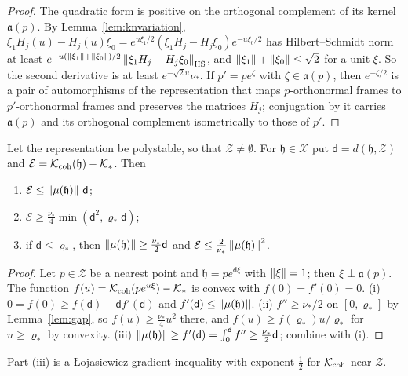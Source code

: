 \begin{proof}
The quadratic form is positive on the orthogonal complement of its kernel
$\mathfrak a(p)$. By Lemma~\ref{lem:knvariation},
$\xi_1H_j(u)-H_j(u)\xi_0=e^{u\xi_1/2}(\xi_1H_j-H_j\xi_0)e^{-u\xi_0/2}$ has
Hilbert--Schmidt norm at least
$e^{-u(\left\lVert\xi_1\right\rVert+\left\lVert\xi_0\right\rVert)/2}\left\lVert\xi_1H_j-H_j\xi_0\right\rVert_{\mathrm{HS}}$, and
$\left\lVert\xi_1\right\rVert+\left\lVert\xi_0\right\rVert\leq\sqrt2$ for a unit $\xi$. So the second
derivative is at least $e^{-\sqrt2u}\nu_*$. If $p'=pe^\zeta$ with
$\zeta\in\mathfrak a(p)$, then $e^{-\zeta/2}$ is a pair of automorphisms of
the representation that maps $p$-orthonormal frames to $p'$-orthonormal
frames and preserves the matrices $H_j$; conjugation by it carries
$\mathfrak a(p)$ and its orthogonal complement isometrically to those of
$p'$.
\end{proof}

\begin{lemma}\label{lem:kngrowth}
Let the representation be polystable, so that $\mathcal Z\neq\emptyset$.
For $\mathfrak h\in\mathcal X$ put $\mathsf d=d(\mathfrak h,\mathcal Z)$ and
$\mathcal E=\mathcal K_{\mathrm{coh}}(\mathfrak h)-\mathcal K_*$. Then
\begin{enumerate}
\item[(i)] $\mathcal E\leq\left\lVert\mu(\mathfrak h)\right\rVert\,\mathsf d$;
\item[(ii)] $\mathcal E\geq\frac{\nu_*}4\min(\mathsf d^2,\varrho_*\mathsf d)$;
\item[(iii)] if $\mathsf d\leq\varrho_*$, then $\left\lVert\mu(\mathfrak h)\right\rVert\geq\frac{\nu_*}2\mathsf d$
 and $\mathcal E\leq\frac2{\nu_*}\left\lVert\mu(\mathfrak h)\right\rVert^2$.
\end{enumerate}
\end{lemma}

\begin{proof}
Let $p\in\mathcal Z$ be a nearest point and $\mathfrak h=pe^{\mathsf d\xi}$ with
$\left\lVert\xi\right\rVert=1$; then $\xi\perp\mathfrak a(p)$. The function
$f(u)=\mathcal K_{\mathrm{coh}}(pe^{u\xi})-\mathcal K_*$ is convex with $f(0)=f'(0)=0$.
(i) $0=f(0)\geq f(\mathsf d)-\mathsf d f'(\mathsf d)$ and $f'(\mathsf d)\leq\left\lVert\mu(\mathfrak h)\right\rVert$.
(ii) $f''\geq\nu_*/2$ on $[0,\varrho_*]$ by Lemma~\ref{lem:gap}, so
$f(u)\geq\frac{\nu_*}4u^2$ there, and $f(u)\geq f(\varrho_*)u/\varrho_*$ for
$u\geq\varrho_*$ by convexity. (iii) $\left\lVert\mu(\mathfrak h)\right\rVert\geq f'(\mathsf d)
=\int_0^\mathsf d f''\geq\frac{\nu_*}2\mathsf d$; combine with (i).
\end{proof}

Part (iii) is a \L ojasiewicz gradient inequality with exponent $\frac12$
for $\mathcal K_{\mathrm{coh}}$ near $\mathcal Z$.


